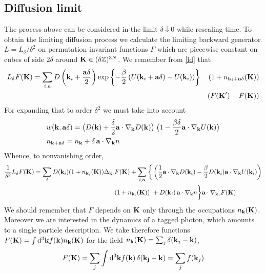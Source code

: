\documentclass[a4paper,12pt,reqno,superscriptaddress,nofootinbib]{revtex4}
\theoremstyle{plain}
\theoremstyle{definition}
\theoremstyle{remark}
\newcommand{\bbZ}{{\mathbb Z}}
\newcommand{\0}{^{(0)}}
\newcommand{\1}{^{(1)}}
\newcommand{\2}{^{(2)}}
\begin{document}
\subsection{Diffusion limit}


The process above can be considered in the limit $\delta\downarrow 0$ while rescaling time.
To obtain the limiting diffusion process we calculate the limiting backward generator $L = L_\delta/\delta^2$ on permutation-invariant functions $F$ which are piecewise constant on cubes of side $2\delta$ around $\vb{K}\in (\delta\bbZ)^{3N}$.   We remember from \eqref{ld} that
\begin{eqnarray}
L_\delta F(\vb{K}) = \sum_{i,a} D\left( \vb{k}_i + \frac{\vb{a} \delta}{2} \right) 
\exp\left\{-\frac{\beta}{2}\left(U(\vb{k}_i + \vb{a} \delta) - 
U(\vb{k}_i)\right)\right\}&&(1+ n_{\vb{k}_i+ \vb{a}\delta}(\vb{K}))\nonumber\\
&&\left(F(\vb{K}') 
-F(\vb{K})\right)
\end{eqnarray}
For expanding that to order $\delta^2$ we must take into account
\begin{align*}
&w(\vb{k},\vb{a}\delta) = \big(D(\vb{k}) + \frac{ \delta}{2}\vb{a}\cdot 
\nabla_{\vb{k}} D (\vb{k})\big)\;\big(1-\frac{\beta\delta}{2}\vb{a}\cdot 
\nabla_{\vb{k}} U (\vb{k})\big) \\
&n_{\vb{k+a\delta}} = n_{\vb{k}} +  \delta\,\vb{a}\cdot \nabla_{\vb{k}} n
\end{align*}
Whence, to nonvanishing order,
\begin{align}
\frac 1{\delta^2}L_\delta F(\vb{K}) = \sum_{i}D(\vb{k}_i)(1+ 
n_{\vb{k}_i}(\vb{K}))\Delta_{\vb{k}_i}&F(\vb{K})+\sum_{i,\vb{a}}\bigg{\{}\left(\frac{1}{2}\vb{a}\cdot \nabla_{\vb{k}} D (\vb{k}_i) 
-\frac{\beta}{2}D(\vb{k}_i)\vb{a}\cdot \nabla_{\vb{k}} U 
(\vb{k}_i)\right)\nonumber\\
&(1+n_{\vb{k}_i}(\vb{K}))\
+ D(\vb{k}_i) \,\vb{a}\cdot 
\nabla_{\vb{k}} n\bigg{\}}\vb{a}\cdot\nabla_{\vb{k}_i}F(\vb{K})\label{2o}
\end{align}
We should remember that $F$ depends on $\vb{K}$ only through the occupations $n_{\vb{k}}(\vb{K})$.
Moreover we are interested in the dynamics of a tagged photon, which amounts to 
a single particle description.  We take therefore functions $F(\vb{K}) = 
\int\dd^3\vb{k} f(\vb{k}) n_{\vb{k}}(\vb{K})$ for the field $n_{\vb{k}}(\vb{K}) 
= \sum_j \delta(\vb{k}_j-\vb{k}) $,
\begin{equation}\label{sumj}
F(\vb{K}) =
\sum_j \int\dd^3\vb{k} f(\vb{k}) \, \delta(\vb{k_j}-\vb{k}) = \sum_j f({\vb{k}_j})
\end{equation}
\end{document}
